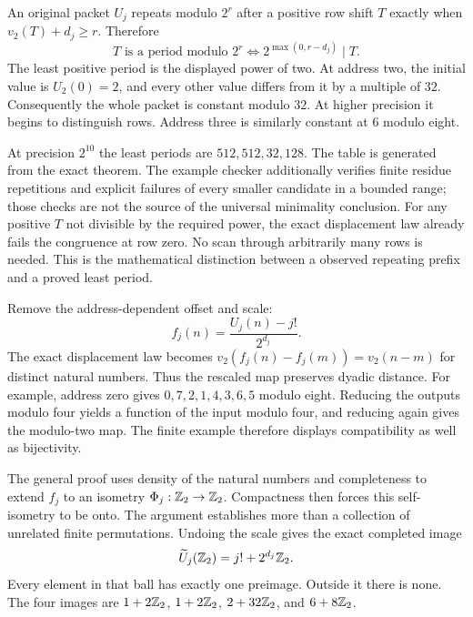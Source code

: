 An original packet $U_j$ repeats modulo $2^r$ after a positive row shift $T$ exactly when $v_2(T)+d_j\ge r$. Therefore
\[
 T\text{ is a period modulo }2^r
 \Longleftrightarrow 2^{\max(0,r-d_j)}\mid T.
\]
The least positive period is the displayed power of two.
At address two, the initial value is $U_2(0)=2$, and every other value differs from it by a multiple of $32$. Consequently the whole packet is constant modulo $32$. At higher precision it begins to distinguish rows. Address three is similarly constant at $6$ modulo eight.

At precision $2^{10}$ the least periods are $512,512,32,128$. The table is generated from the exact theorem. The example checker additionally verifies finite residue repetitions and explicit failures of every smaller candidate in a bounded range; those checks are not the source of the universal minimality conclusion.
For any positive $T$ not divisible by the required power, the exact displacement law already fails the congruence at row zero. No scan through arbitrarily many rows is needed. This is the mathematical distinction between a observed repeating prefix and a proved least period.

Remove the address-dependent offset and scale:
\[
 f_j(n)=\frac{U_j(n)-j!}{2^{d_j}}.
\]
The exact displacement law becomes $v_2(f_j(n)-f_j(m))=v_2(n-m)$ for distinct natural numbers. Thus the rescaled map preserves dyadic distance.
For example, address zero gives $0,7,2,1,4,3,6,5$ modulo eight. Reducing the outputs modulo four yields a function of the input modulo four, and reducing again gives the modulo-two map. The finite example therefore displays compatibility as well as bijectivity.

The general proof uses density of the natural numbers and completeness to extend $f_j$ to an isometry $\Phi_j:\mathbb Z_2\to\mathbb Z_2$. Compactness then forces this self-isometry to be onto. The argument establishes more than a collection of unrelated finite permutations.
Undoing the scale gives the exact completed image
\[
 \widetilde U_j(\mathbb Z_2)=j!+2^{d_j}\mathbb Z_2.
\]
Every element in that ball has exactly one preimage. Outside it there is none. The four images are $1+2\mathbb Z_2$, $1+2\mathbb Z_2$, $2+32\mathbb Z_2$, and $6+8\mathbb Z_2$.

